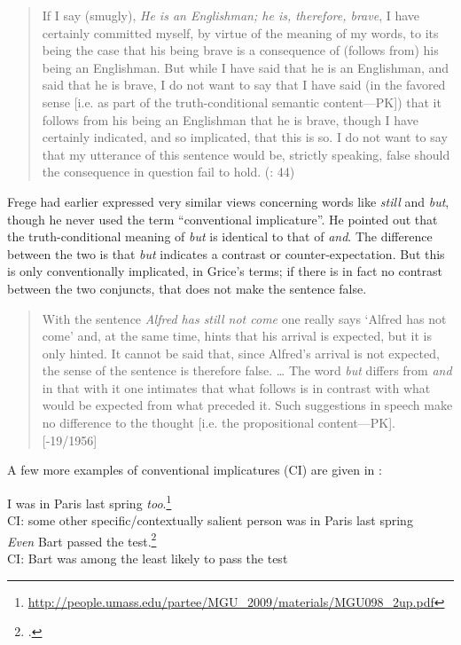 \begin{quote}
If I say (smugly), \textit{He is an Englishman; he is, therefore, brave}, I have certainly committed myself, by virtue of the meaning of my words, to its being the case that his being brave is a consequence of (follows from) his being an Englishman. But while I have said that he is an Englishman, and said that he is brave, I do not want to say that I have said (in the favored sense [i.e. as part of the truth-conditional semantic content—PK]) that it follows from his being an Englishman that he is brave, though I have certainly indicated, and so implicated, that this is so. I do not want to say that my utterance of this sentence would be, strictly speaking, false should the consequence in question fail to hold. (\citealt{Grice1975}: 44)
\end{quote}


Frege had earlier expressed very similar views concerning words like \textit{still} and \textit{but}, though he never used the term “conventional implicature”. He pointed out that the truth-conditional meaning of \textit{but} is identical to that of \textit{and}. The difference between the two is that \textit{but} indicates a contrast or counter-expectation. But this is only conventionally implicated, in Grice’s terms; if there is in fact no contrast between the two conjuncts, that does not make the sentence false.


\begin{quote}
With the sentence \textit{Alfred has still not come} one really says ‘Alfred has not come’ and, at the same time, hints that his arrival is expected, but it is only hinted. It cannot be said that, since Alfred’s arrival is not expected, the sense of the sentence is therefore false. … The word \textit{but} differs from \textit{and} in that with it one intimates that what follows is in contrast with what would be expected from what preceded it. Such suggestions in speech make no difference to the thought [i.e. the propositional content—PK]. [\citealt{Frege1918}-19/1956]
\end{quote}


A few more examples of conventional implicatures (CI) are given in :


\ea \label{ex:8.16}
\ea  I was in Paris last spring \textit{too}.\footnote{\url{http://people.umass.edu/partee/MGU_2009/materials/MGU098_2up.pdf}} \\
CI: some other specific/contextually salient person was in Paris last spring\\
\ex   \textit{Even} Bart passed the test.\footnote{\citet{Potts2007a}.}\\
CI: Bart was among the least likely to pass the test
\z
\z


